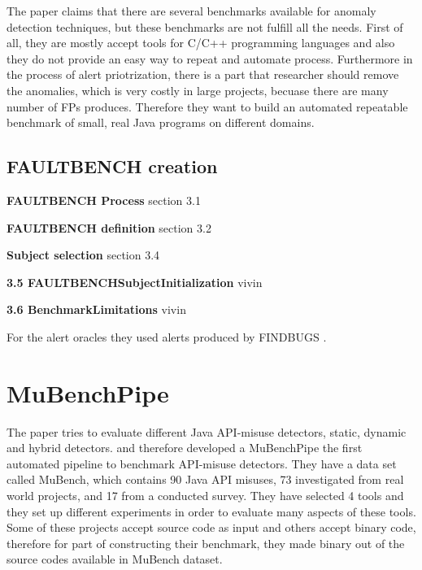\documentclass[authoryear,preprint]{sigplanconf}
\begin{document}
The paper claims that there are several benchmarks available for anomaly detection techniques, but these benchmarks are not fulfill all the needs. First of all, they are mostly accept tools for C/C++ programming languages and also they do not provide an easy way to repeat and automate process. Furthermore in the process of alert priotrization, there is a part that researcher should remove the anomalies, which is very costly in large projects, becuase there are many number of FPs produces. Therefore they want to build an automated repeatable benchmark of small, real Java programs on different domains. 

\subsection{FAULTBENCH creation } 

\textbf{ FAULTBENCH Process} section 3.1

\textbf{ FAULTBENCH definition} section 3.2

\textbf{Subject selection} section 3.4

\textbf{3.5 FAULTBENCHSubjectInitialization} vivin

\textbf{3.6 BenchmarkLimitations} vivin



 For the alert oracles they used alerts produced by FINDBUGS \cite{hovemeyer2004finding}.

\section{MuBenchPipe}
\label{sec:sec_mubenchpipe}

The paper tries to evaluate different Java API-misuse detectors, static, dynamic and hybrid detectors. and therefore developed a MuBenchPipe \cite{8338426} the first automated pipeline to benchmark API-misuse detectors. They have a data set called MuBench, which contains 90 Java API misuses, 73 investigated from real world projects, and 17 from a conducted survey. They have selected 4 tools and they set up different experiments in order to evaluate many aspects of these tools. Some of these projects accept source code as input and others accept binary code, therefore for part of constructing their benchmark, they made binary out of the source codes available in MuBench dataset. 
\end{document}
